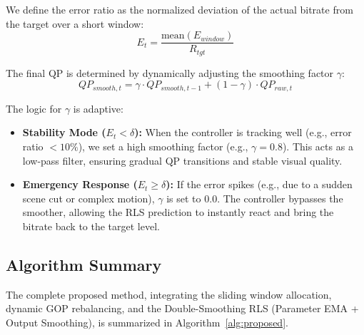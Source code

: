 We define the error ratio as the normalized deviation of the actual bitrate from the target over a short window:
\begin{equation}
    E_t = \frac{\text{mean}(E_{window})}{R_{tgt}}
\end{equation}

The final QP is determined by dynamically adjusting the smoothing factor $\gamma$:
\begin{equation}
    QP_{smooth, t} = \gamma \cdot QP_{smooth, t-1} + (1 - \gamma) \cdot QP_{raw, t}
\end{equation}

The logic for $\gamma$ is adaptive:
\begin{itemize}
    \item \textbf{Stability Mode ($E_t < \delta$):} When the controller is tracking well (e.g., error ratio $< 10\%$), we set a high smoothing factor (e.g., $\gamma = 0.8$). This acts as a low-pass filter, ensuring gradual QP transitions and stable visual quality.
    \item \textbf{Emergency Response ($E_t \ge \delta$):} If the error spikes (e.g., due to a sudden scene cut or complex motion), $\gamma$ is set to $0.0$. The controller bypasses the smoother, allowing the RLS prediction to instantly react and bring the bitrate back to the target level.
\end{itemize}

\subsection{Algorithm Summary}

The complete proposed method, integrating the sliding window allocation, dynamic GOP rebalancing, and the Double-Smoothing RLS (Parameter EMA + Output Smoothing), is summarized in Algorithm~\ref{alg:proposed}.

